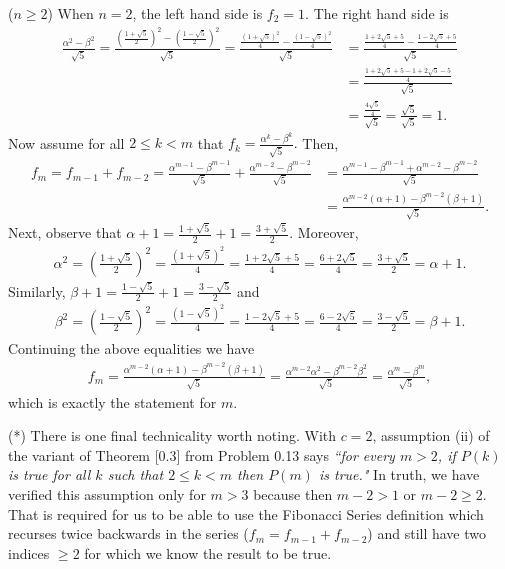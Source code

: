 \documentclass[12pt]{article}
\numberwithin{theorem}{section}
\numberwithin{equation}{section}
\numberwithin{remark}{section}
\numberwithin{definition}{section}
\numberwithin{theorem}{section}
\numberwithin{lemma}{section}
\numberwithin{example}{section}
\begin{document}
\noindent ($n\ge2$) When $n=2$, the left hand side is $f_2 = 1$. The right hand side is 
\begin{align*}
	\frac{\alpha^2-\beta^2}{\sqrt{5}}=\frac{\left(\frac{1+\sqrt{5}}{2}\right)^2-\left(\frac{1-\sqrt{5}}{2}\right)^2}{\sqrt{5}}=\frac{\frac{\left(1+\sqrt{5}\right)^2}{4}-\frac{\left(1-\sqrt{5}\right)^2}{4}}{\sqrt{5}}&=\frac{\frac{1+2\sqrt{5}+5}{4}-\frac{1-2\sqrt{5}+5}{4}}{\sqrt{5}}\\
	&=\frac{\frac{1+2\sqrt{5}+5-1+2\sqrt{5}-5}{4}}{\sqrt{5}}\\
	&=\frac{\frac{4\sqrt{5}}{4}}{\sqrt{5}}=\frac{\sqrt{5}}{\sqrt{5}}=1.
\end{align*}
Now assume for all $2\le k<m$ that $f_k = \frac{\alpha^k-\beta^k}{\sqrt{5}}.$ Then, 
\begin{align*}
	f_m = f_{m-1} + f_{m-2} = \frac{\alpha^{m-1}-\beta^{m-1}}{\sqrt{5}} +  \frac{\alpha^{m-2}-\beta^{m-2}}{\sqrt{5}} & = \frac{\alpha^{m-1}-\beta^{m-1}+\alpha^{m-2}-\beta^{m-2}}{\sqrt{5}} \\
	& = \frac{\alpha^{m-2}(\alpha+1)-\beta^{m-2}(\beta+1)}{\sqrt{5}}.
\end{align*}
Next, observe that $\alpha+1=\frac{1+\sqrt{5}}{2}+1=\frac{3+\sqrt{5}}{2}$. Moreover,
\begin{align*}
	\alpha^2=\left(\frac{1+\sqrt{5}}{2}\right)^2=\frac{\left(1+\sqrt{5}\right)^2}{4}=\frac{1+2\sqrt{5}+5}{4}=\frac{6+2\sqrt{5}}{4}=\frac{3+\sqrt{5}}{2}=\alpha+1. 
\end{align*}
Similarly, $\beta+1=\frac{1-\sqrt{5}}{2}+1=\frac{3-\sqrt{5}}{2}$ and 
\begin{align*}
	\beta^2=\left(\frac{1-\sqrt{5}}{2}\right)^2=\frac{\left(1-\sqrt{5}\right)^2}{4}=\frac{1-2\sqrt{5}+5}{4}=\frac{6-2\sqrt{5}}{4}=\frac{3-\sqrt{5}}{2}=\beta+1. 
\end{align*}
Continuing the above equalities we have
\begin{align*}
	f_m  = \frac{\alpha^{m-2}(\alpha+1)-\beta^{m-2}(\beta+1)}{\sqrt{5}} = \frac{\alpha^{m-2}\alpha^2-\beta^{m-2}\beta^2}{\sqrt{5}} = \frac{\alpha^{m}-\beta^{m}}{\sqrt{5}},
\end{align*}
which is exactly the statement for $m$. 

\vspace{\baselineskip}

\noindent (*) There is one final technicality worth noting. With $c=2$, assumption (ii) of the variant of Theorem [0.3] from Problem 0.13 says \emph{``for every $m>2$, if $P(k)$ is true for all $k$ such that $2\le k < m$ then $P(m)$ is true."} In truth, we have verified this assumption only for $m>3$ because then $m-2>1$ or $m-2\ge 2$. That is required for us to be able to use the Fibonacci Series definition which recurses twice backwards in the series ($f_m = f_{m-1} + f_{m-2}$) and still have two indices $\ge 2$ for which we know the result to be true.
\end{document}
